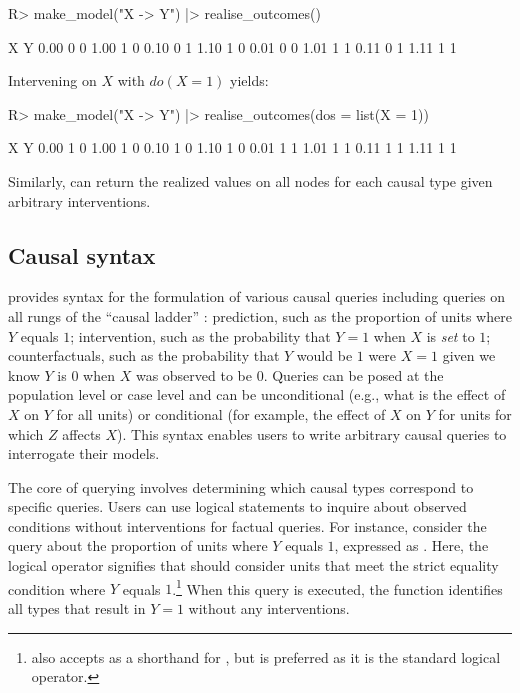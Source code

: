 \documentclass[
  11pt,
  article]{jss}
\renewcommand{\texttt}[1]{\code{#1}}
\begin{document}
\begin{CodeChunk}
\begin{CodeInput}
R> make_model("X -> Y") |> realise_outcomes()
\end{CodeInput}

\begin{CodeOutput}
     X Y
0.00 0 0
1.00 1 0
0.10 0 1
1.10 1 0
0.01 0 0
1.01 1 1
0.11 0 1
1.11 1 1
\end{CodeOutput}
\end{CodeChunk}

Intervening on \(X\) \citep[see][]{pearl_causality_2009} with
\(do(X=1)\) yields:

\begin{CodeChunk}
\begin{CodeInput}
R> make_model("X -> Y") |> realise_outcomes(dos = list(X = 1))
\end{CodeInput}

\begin{CodeOutput}
     X Y
0.00 1 0
1.00 1 0
0.10 1 0
1.10 1 0
0.01 1 1
1.01 1 1
0.11 1 1
1.11 1 1
\end{CodeOutput}
\end{CodeChunk}

Similarly, \texttt{realise\_outcomes()} can return the realized values
on all nodes for each causal type given arbitrary interventions.

\subsection{Causal syntax}\label{sec-syntax}

 provides syntax for the formulation of various
causal queries including queries on all rungs of the ``causal ladder''
\citep{pearl_causality_2009}: prediction, such as the proportion of
units where \(Y\) equals \(1\); intervention, such as the probability
that \(Y = 1\) when \(X\) is \emph{set} to \(1\); counterfactuals, such
as the probability that \(Y\) would be \(1\) were \(X = 1\) given we
know \(Y\) is \(0\) when \(X\) was observed to be \(0\). Queries can be
posed at the population level or case level and can be unconditional
(e.g., what is the effect of \(X\) on \(Y\) for all units) or
conditional (for example, the effect of \(X\) on \(Y\) for units for
which \(Z\) affects \(X\)). This syntax enables users to write arbitrary
causal queries to interrogate their models.

The core of querying involves determining which causal types correspond
to specific queries. Users can use logical statements to inquire about
observed conditions without interventions for factual queries. For
instance, consider the query about the proportion of units where \(Y\)
equals \(1\), expressed as \texttt{"Y\ ==\ 1"}. Here, the logical
operator \texttt{==} signifies that  should consider
units that meet the strict equality condition where \(Y\) equals
\(1\).\footnote{ also accepts \texttt{=} as a
  shorthand for \texttt{==}, but \texttt{==} is preferred as it is the
  standard logical operator.} When this query is executed, the
\texttt{get\_query\_types()} function identifies all types that result
in \(Y=1\) without any interventions.
\end{document}

